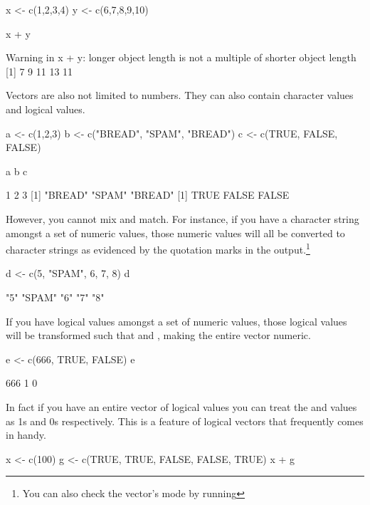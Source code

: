 \begin{inR}
x <- c(1,2,3,4)
y <- c(6,7,8,9,10)

x + y
\end{inR}

\begin{outR}
Warning in x + y: longer object length is not a multiple
of shorter object length
[1]  7  9 11 13 11
\end{outR}

Vectors are also not limited to numbers. They can also contain character values and logical values.
\begin{inR}
a <- c(1,2,3)
b <- c("BREAD", "SPAM", "BREAD")
c <- c(TRUE, FALSE, FALSE)

a
b
c
\end{inR}

\begin{outR}
[1] 1 2 3
[1] "BREAD" "SPAM"  "BREAD"
[1]  TRUE FALSE FALSE
\end{outR}

\noindent
However, you cannot mix and match. For instance, if you have a character string amongst a set of numeric values, those numeric values will all be converted to character strings as evidenced by the quotation marks in the output.\footnote{You can also check the vector's mode by running }

\begin{inR}
d <- c(5, "SPAM", 6, 7, 8)
d
\end{inR}

\begin{outR}
[1] "5"    "SPAM" "6"    "7"    "8"  
\end{outR}

\noindent
If you have logical values amongst a set of numeric values, those logical values will be transformed such that  and , making the entire vector numeric.

\begin{inR}
e <- c(666, TRUE, FALSE)
e
\end{inR}

\begin{outR}
[1] 666   1   0
\end{outR}

\noindent
In fact if you have an entire vector of logical values you can treat the  and  values as 1s and 0s respectively. This is a feature of logical vectors that frequently comes in handy. 

\begin{inR}
x <- c(100)
g <- c(TRUE, TRUE, FALSE, FALSE, TRUE)
x + g
\end{inR}


